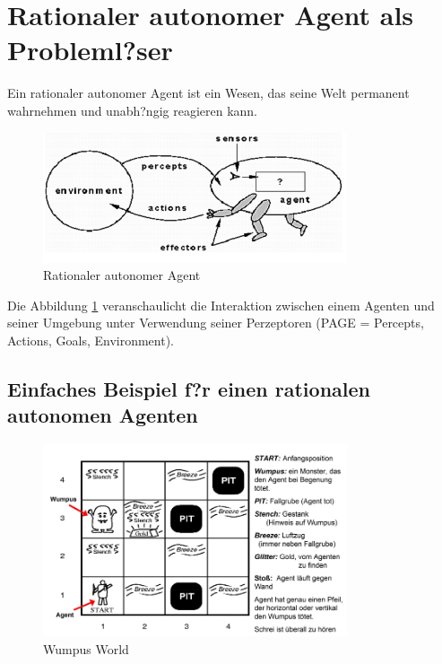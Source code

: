 \section{Rationaler autonomer Agent als Probleml?ser}

Ein rationaler autonomer Agent ist ein Wesen, das seine Welt permanent wahrnehmen und unabh?ngig reagieren kann.

\begin{figure}[H]
    \centering
    \includegraphics[width=0.8\textwidth]{figures/rational-agent.png}
    \caption{Rationaler autonomer Agent}
    \label{fig:rational-agent-diagram}
\end{figure}

Die Abbildung \ref{fig:rational-agent-diagram} veranschaulicht die Interaktion zwischen einem Agenten und seiner Umgebung unter Verwendung seiner Perzeptoren (PAGE = Percepts, Actions, Goals, Environment). 

\subsection{Einfaches Beispiel f?r einen rationalen autonomen Agenten}

\begin{figure}[H]
    \centering
    \includegraphics[width=0.8\textwidth]{figures/wumpus.png}
    \caption{Wumpus World}
    \label{fig:wumpus-example}
\end{figure}

